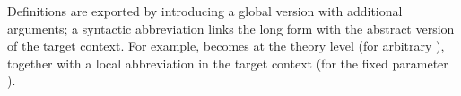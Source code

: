 \begin{isabellebody}
\begin{isamarkuptext}
  Definitions are exported by introducing a global version with
  additional arguments; a syntactic abbreviation links the long form
  with the abstract version of the target context.  For example,
   becomes  at the theory
  level (for arbitrary ), together with a local
  abbreviation  in the target context (for the
  fixed parameter ).


\end{isamarkuptext}
\end{isabellebody}
